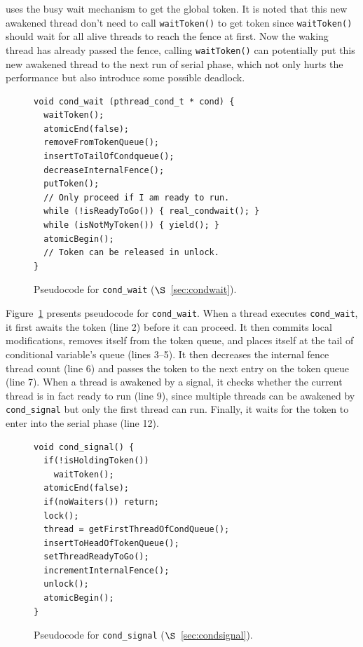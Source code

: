 \dthreads{} uses the busy wait mechanism to get the global token. 
It is noted that this new awakened thread don't need to call \texttt{waitToken()} to get
token since \texttt{waitToken()} should wait for all alive threads to reach the fence at first. 
Now the waking thread has already passed the fence, calling \texttt{waitToken()} can potentially
put this new awakened thread to the next run of serial phase, which not only hurts
the performance but also introduce some possible deadlock.

\begin{figure}
\begin{lstlisting}
void cond_wait (pthread_cond_t * cond) {
  waitToken();
  atomicEnd(false);
  removeFromTokenQueue();
  insertToTailOfCondqueue();
  decreaseInternalFence();
  putToken();
  // Only proceed if I am ready to run.
  while (!isReadyToGo()) { real_condwait(); }
  while (isNotMyToken()) { yield(); } 
  atomicBegin();
  // Token can be released in unlock. 
}
\end{lstlisting}
\caption{Pseudocode for \texttt{cond\_wait} ($\S$~\ref{sec:condwait}). 
\label{fig:condwait}}
\end{figure}

Figure~\ref{fig:condwait} presents pseudocode
for \texttt{cond\_wait}.  When a thread executes \texttt{cond\_wait},
it first awaits the token (line 2) before it can proceed.  It then
commits local modifications, removes itself from the token queue, and
places itself at the tail of conditional variable's queue (lines
3--5). It then decreases the internal fence thread count (line 6) and passes
the token to the next entry on the token queue (line 7). When a thread
is awakened by a signal, it checks whether the current thread is in
fact ready to run (line 9), since multiple threads can be awakened
by \texttt{cond\_signal} but only the first thread can run.  Finally,
it waits for the token to enter into the serial phase (line 12). 

\label{sec:condsignal}

\begin{figure}
\begin{lstlisting}
void cond_signal() {
  if(!isHoldingToken())
    waitToken();
  atomicEnd(false);
  if(noWaiters()) return;
  lock();
  thread = getFirstThreadOfCondQueue();
  insertToHeadOfTokenQueue();
  setThreadReadyToGo();
  incrementInternalFence();
  unlock();
  atomicBegin();
}
\end{lstlisting}
\caption{Pseudocode for \texttt{cond\_signal} ($\S$~\ref{sec:condsignal}). 
\label{fig:condsignal}}
\end{figure}

